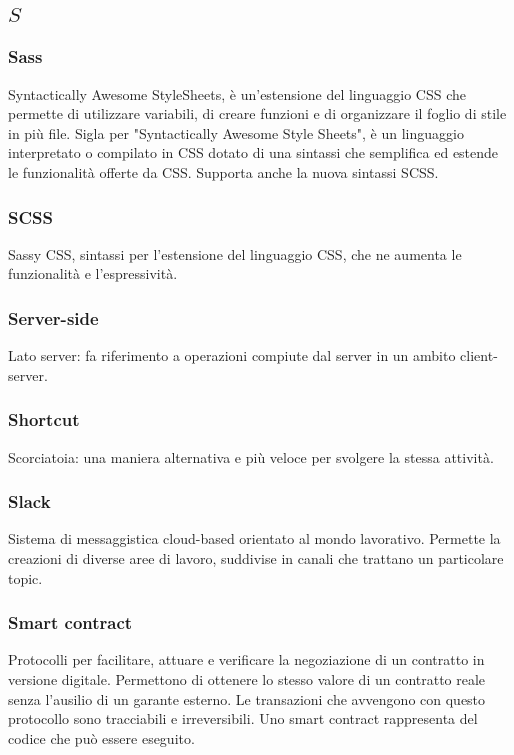 \subsection*{\quad$S\quad$}
\subsubsection*{Sass}
Syntactically Awesome StyleSheets, è un'estensione del linguaggio CSS che permette di utilizzare variabili, di creare funzioni e di organizzare il foglio di stile in più file. 
Sigla per "Syntactically Awesome Style Sheets", è un linguaggio interpretato o compilato in CSS dotato di una sintassi che semplifica ed estende le funzionalità offerte da CSS. Supporta anche la nuova sintassi SCSS\glo.

\subsubsection*{SCSS}
Sassy CSS, sintassi per l'estensione del linguaggio CSS, che ne aumenta le funzionalità e l'espressività.

\subsubsection*{Server-side}
Lato server: fa riferimento a operazioni compiute dal server in un ambito client-server. 

\subsubsection*{Shortcut}
Scorciatoia: una maniera alternativa e più veloce per svolgere la stessa attività.


\subsubsection*{Slack}
Sistema di messaggistica cloud-based orientato al mondo lavorativo. Permette la creazioni di diverse aree di lavoro, suddivise in canali che trattano un particolare topic.

\subsubsection*{Smart contract}
Protocolli per facilitare, attuare e verificare la negoziazione di un contratto in versione digitale. Permettono di ottenere lo stesso valore di un contratto reale senza l'ausilio di un garante esterno. Le transazioni che avvengono con questo protocollo sono tracciabili e irreversibili. Uno smart contract rappresenta del codice che può essere eseguito.

